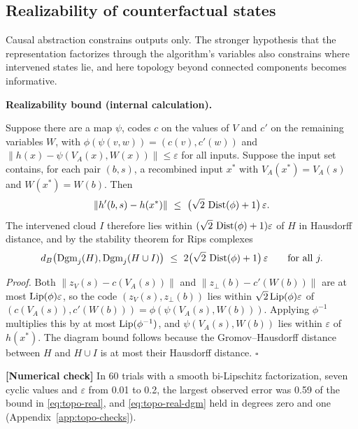 \documentclass[11pt,a4paper]{article}
\newcommand{\eps}{\varepsilon}
\newcommand{\evl}[2]{{\small\bfseries\color{#1}[#2]}}
\newcommand{\LNum}{\evl{cnum}{Numerical check}}
\newenvironment{keybox}[1]{%
  \def\FrameCommand{{\color{ccalc}\vrule width 1.6pt}\hspace{8pt}}%
  \MakeFramed{\advance\hsize-\width\FrameRestore}%
  \noindent\textbf{#1}\par\smallskip\noindent\ignorespaces}{\endMakeFramed}
\begin{document}
\subsection{Realizability of counterfactual states}
\label{app:topo-real}

Causal abstraction constrains outputs only. The stronger hypothesis that the
representation factorizes through the algorithm's variables also constrains
where intervened states lie, and here topology beyond connected components
becomes informative.

\begin{keybox}{Realizability bound (internal calculation).}
Suppose there are a map $\psi$, codes $c$ on the values of $V$ and $c'$ on the
remaining variables $W$, with $\phi(\psi(v,w))=(c(v),c'(w))$ and
$\|h(x)-\psi(V_A(x),W(x))\|\le\eps$ for all inputs. Suppose the input set
contains, for each pair $(b,s)$, a recombined input $x^*$ with
$V_A(x^*)=V_A(s)$ and $W(x^*)=W(b)$. Then
\begin{equation}
\|h'(b,s)-h(x^*)\|\ \le\ \bigl(\sqrt2\,\Dist(\phi)+1\bigr)\,\eps .
\label{eq:topo-real}
\end{equation}
The intervened cloud $I$ therefore lies within
$(\sqrt2\,\Dist(\phi)+1)\eps$ of $H$ in Hausdorff distance, and by the
stability theorem for Rips complexes \cite{chazal2014}
\begin{equation}
d_B\bigl(\Dgm_j(H),\Dgm_j(H\cup I)\bigr)\ \le\ 2\bigl(\sqrt2\,\Dist(\phi)+1\bigr)\,\eps
\qquad\text{for all }j .
\label{eq:topo-real-dgm}
\end{equation}
\end{keybox}

\noindent\emph{Proof.} Both $\|z_V(s)-c(V_A(s))\|$ and
$\|z_\perp(b)-c'(W(b))\|$ are at most $\Lip(\phi)\eps$, so the code
$(z_V(s),z_\perp(b))$ lies within $\sqrt2\Lip(\phi)\eps$ of
$(c(V_A(s)),c'(W(b)))=\phi(\psi(V_A(s),W(b)))$. Applying $\phi^{-1}$
multiplies this by at most $\operatorname{Lip}(\phi^{-1})$, and $\psi(V_A(s),W(b))$ lies
within $\eps$ of $h(x^*)$. The diagram bound follows because the
Gromov--Hausdorff distance between $H$ and $H\cup I$ is at most their
Hausdorff distance. $\square$

\LNum{} In 60 trials with a smooth bi-Lipschitz factorization, seven cyclic
values and $\eps$ from 0.01 to 0.2, the largest observed error was 0.59 of the
bound in \eqref{eq:topo-real}, and \eqref{eq:topo-real-dgm} held in degrees
zero and one (Appendix~\ref{app:topo-checks}).
\end{document}
